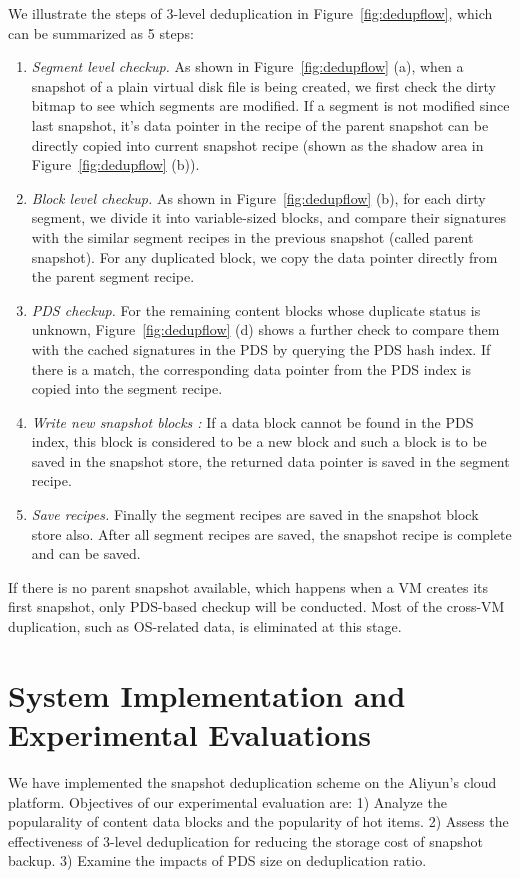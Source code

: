 We illustrate the steps of 3-level deduplication in Figure~\ref{fig:dedupflow}, which can be summarized as 5 steps:
\begin{enumerate}
\item {\em Segment level checkup.}
As shown in Figure~\ref{fig:dedupflow} (a),
when  a snapshot of a plain virtual disk file is being created, we first check the dirty bitmap 
to see which segments are modified. If a segment is not modified since last snapshot, 
it's data pointer in the recipe of the  parent snapshot  can be directly copied into 
current snapshot recipe (shown as the shadow area in Figure~\ref{fig:dedupflow} (b)).

\item {\em Block level checkup.}
As shown in Figure~\ref{fig:dedupflow} (b),
for each dirty segment, we divide it into variable-sized blocks,
and compare their signatures with  the similar segment recipes in the previous snapshot (called parent
snapshot). 
For any duplicated block, we copy the data pointer directly from the parent segment recipe. 
\item {\em PDS checkup.} For the remaining  content blocks whose duplicate status is unknown,
Figure~\ref{fig:dedupflow} (d)
shows  a further check to compare  them with  the cached signatures in the PDS by querying
the PDS hash index. If there is a match, the corresponding data pointer from the PDS index is
copied into the segment recipe. 
\item {\em Write new snapshot blocks :}
If a data block cannot be found in the PDS index, this block is considered to be a new block
and such a block is to be saved in the snapshot store, the returned data pointer is
saved in the  segment recipe.
\item {\em Save recipes.} Finally the  segment recipes are saved in the  snapshot block store also.
 After all segment recipes are saved, the snapshot recipe is complete and can be saved.
\end{enumerate}

If there is no parent snapshot available, which happens when a VM creates its first snapshot, 
only PDS-based checkup will be conducted. 
Most of the cross-VM duplication, such as OS-related data, is eliminated
at this stage. 


\section{System Implementation and Experimental Evaluations}
\label{inline:impl}
We have implemented the snapshot deduplication scheme on the Aliyun's cloud platform.
Objectives of our experimental evaluation are:
1) Analyze the popularality of content data blocks and the popularity  of hot items. 
2) Assess the effectiveness  of 3-level deduplication for reducing the storage cost of snapshot 
backup. 
3) Examine the impacts of PDS size on deduplication ratio.

